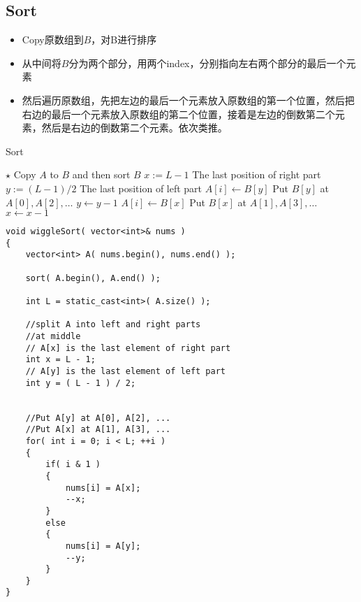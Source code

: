 \subsection{Sort}
\begin{itemize}
\item Copy原数组到$B$，对B进行排序
\item 从中间将$B$分为两个部分，用两个index，分别指向左右两个部分的最后一个元素
\item 然后遍历原数组，先把左边的最后一个元素放入原数组的第一个位置，然后把右边的最后一个元素放入原数组的第二个位置，接着是左边的倒数第二个元素，然后是右边的倒数第二个元素。依次类推。
\end{itemize}
\setcounter{algorithm}{0}
\begin{algorithm}[H]
\caption{Sort}
\begin{algorithmic}[1]
\State $\star$ Copy $A$ to $B$ and then sort $B$
\State $x:=L-1$ \Comment The last position of right part
\State $y:=(L-1)/2$ \Comment The last position of left part
\State $ A[i]\gets B[y] $ \Comment Put $B[y]$ at $A[0], A[2],\ldots$
\State $y\gets y-1$
\Else
\State $ A[i]\gets B[x] $ \Comment Put $B[x]$ at $A[1], A[3],\ldots$
\State $x\gets x-1$
\EndIf
\EndFor
\EndProcedure
\end{algorithmic}
\end{algorithm}
\setcounter{lstlisting}{0}
\begin{lstlisting}[style=customc, caption={Sort}]
void wiggleSort( vector<int>& nums )
{
    vector<int> A( nums.begin(), nums.end() );

    sort( A.begin(), A.end() );

    int L = static_cast<int>( A.size() );

    //split A into left and right parts
    //at middle
    // A[x] is the last element of right part
    int x = L - 1;
    // A[y] is the last element of left part
    int y = ( L - 1 ) / 2;


    //Put A[y] at A[0], A[2], ...
    //Put A[x] at A[1], A[3], ...
    for( int i = 0; i < L; ++i )
    {
        if( i & 1 )
        {
            nums[i] = A[x];
            --x;
        }
        else
        {
            nums[i] = A[y];
            --y;
        }
    }
}
\end{lstlisting}
